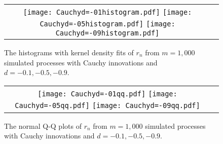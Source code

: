 \documentclass[11pt]{article}
\begin{document}
\begin{figure}[H]
\centering
\begin{tabular}{cc}
\texttt{[image: Cauchyd=-01histogram.pdf]}
\texttt{[image: Cauchyd=-05histogram.pdf]}
\texttt{[image: Cauchyd=-09histogram.pdf]}
\end{tabular}
\caption {The histograms with kernel density fits of $r_n$ from $m=1,000$ simulated processes with Cauchy innovations and $d=-0.1, -0.5, -0.9$.\label{fig:3}}
\end{figure}
\begin{figure}[H]
\centering
\begin{tabular}{cc}
\texttt{[image: Cauchyd=-01qq.pdf]}
\texttt{[image: Cauchyd=-05qq.pdf]}
\texttt{[image: Cauchyd=-09qq.pdf]}
\end{tabular}
\caption {The normal Q-Q plots of $r_n$ from $m=1,000$ simulated processes with Cauchy innovations and $d=-0.1, -0.5, -0.9$.\label{fig:4}}
\end{figure}
\end{document}
